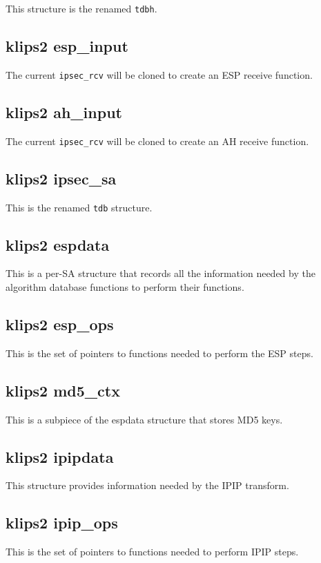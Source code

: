 This structure is the renamed {\tt tdbh}.

\subsection{klips2 esp\_input}

The current {\tt ipsec\_rcv} will be cloned to create an ESP receive
function.

\subsection{klips2 ah\_input}

The current {\tt ipsec\_rcv} will be cloned to create an AH receive function.

\subsection{klips2 ipsec\_sa}

This is the renamed {\tt tdb} structure.

\subsection{klips2 espdata}

This is a per-SA structure that records all the information needed by the
algorithm database functions to perform their functions.

\subsection{klips2 esp\_ops}

This is the set of pointers to functions needed to perform the ESP steps.

\subsection{klips2 md5\_ctx}

This is a subpiece of the espdata structure that stores MD5 keys.

\subsection{klips2 ipipdata}

This structure provides information needed by the IPIP transform.

\subsection{klips2 ipip\_ops}

This is the set of pointers to functions needed to perform IPIP steps.
